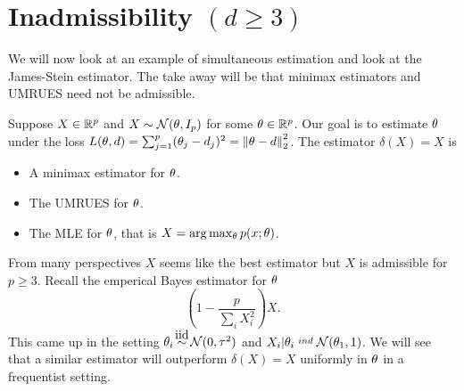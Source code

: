 \section{Inadmissibility $(d \ge 3)$}
We will now look at an example of simultaneous estimation and look at the James-Stein estimator. The take away will be that minimax estimators and UMRUES need not be admissible.

Suppose $X\in {\mathbb R}^p$ and $X \sim {{\mathcal{N}}}({\theta}, I_p)$ for some ${\theta} \in {\mathbb R}^p$. Our goal is to estimate ${\theta}$ under the loss $L({\theta},d) = \sum_{j=1}^p ({\theta}_j-d_j)^2 = \left\|{\theta}-d\right\|_2^2$. The estimator $\delta(X) =X$ is
\begin{itemize}
    \item A minimax estimator for ${\theta}$.
    \item The UMRUES for ${\theta}$.
    \item The MLE for ${\theta}$, that is $X = \arg\max_{\theta} p(x;{\theta})$.
\end{itemize}
From many perspectives $X$ seems like the best estimator but $X$ is admissible for $p \ge 3$. Recall the emperical Bayes estimator for ${\theta}$
\[\left(1-\frac{p}{\sum_i X_i^2}\right)X. \]
This came up in the setting $\ta_i \iid \Na(0,\tau^2)$ and $X_i|{\theta}_i \stackrel{ind}{~} {{\mathcal{N}}}({\theta}_1,1)$. We will see that a similar estimator will outperform $\delta(X)=X$ uniformly in ${\theta}$ in a frequentist setting. 

